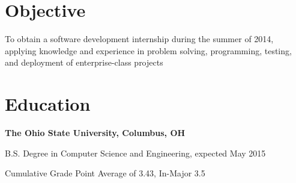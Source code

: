\documentclass[letterpaper]{resume}
\begin{document}
\author{Christopher John Wallace}
\maketitle

\section{Objective}
\begin{compactitem}
	\item
		To obtain a software development internship during the summer of 2014, applying
		knowledge and experience in problem solving, programming, testing, and
		deployment of enterprise-class projects
\end{compactitem}

\section{Education}
\textbf{The Ohio State University, Columbus, OH}

\begin{compactitem}
	\item B.S. Degree in Computer Science and Engineering, expected May 2015
	\item Cumulative Grade Point Average of 3.43, In-Major 3.5
\end{compactitem}

\end{document}
